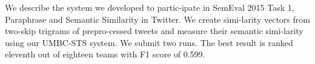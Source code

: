 We describe the system we developed to partic-ipate in SemEval 2015 Task 1, Paraphrase and Semantic Similarity in Twitter. We create simi-larity vectors from two-skip trigrams of prepro-cessed tweets and measure their semantic simi-larity using our UMBC-STS system. We submit two runs. The best result is ranked eleventh out of eighteen teams with F1 score of 0.599.
